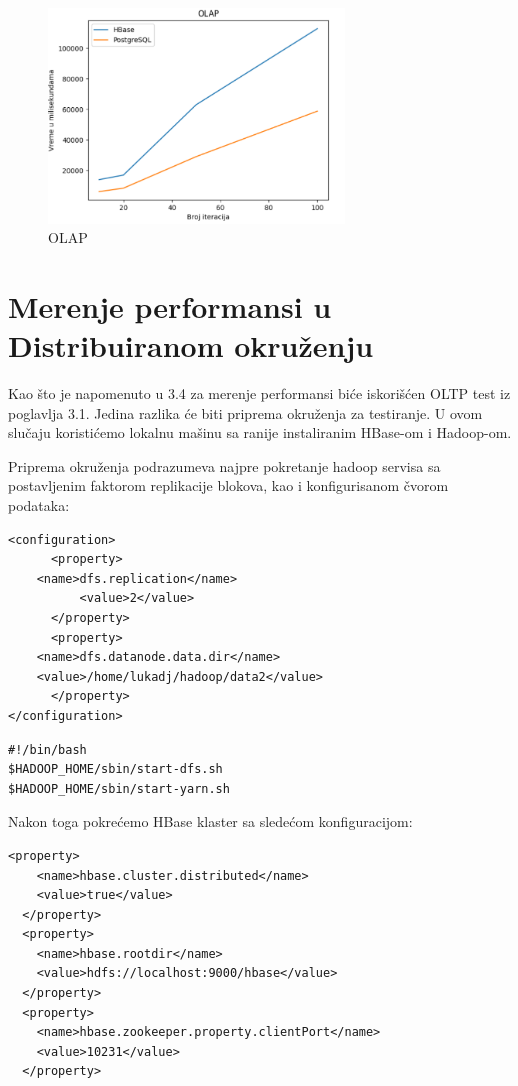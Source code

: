 \documentclass[12pt,oneside]{memoir}
\begin{document}
\begin{figure}[!ht]
  \centering
  \includegraphics[width=0.7\textwidth]{olap-vizualization2.png}
  \caption{OLAP}
  \label{fig:grafikon}
\end{figure}



\section{Merenje performansi u Distribuiranom okruženju}

Kao što je napomenuto u 3.4 za merenje performansi biće iskorišćen OLTP test iz poglavlja 3.1. Jedina razlika će biti priprema okruženja za testiranje. U ovom slučaju koristićemo lokalnu mašinu sa ranije instaliranim HBase-om i Hadoop-om. 

Priprema okruženja podrazumeva najpre pokretanje hadoop servisa sa postavljenim faktorom replikacije blokova, kao i konfigurisanom čvorom podataka:

\begin{lstlisting}[title={hdfs-site.xml},captionpos=t]
<configuration>
      <property>
	<name>dfs.replication</name>
          <value>2</value>
      </property>
      <property>
  	<name>dfs.datanode.data.dir</name>
  	<value>/home/lukadj/hadoop/data2</value>
      </property>
</configuration>
\end{lstlisting}

\begin{lstlisting}[title={start-hadoop.sh},captionpos=t]
#!/bin/bash
$HADOOP_HOME/sbin/start-dfs.sh
$HADOOP_HOME/sbin/start-yarn.sh
\end{lstlisting}

Nakon toga pokrećemo HBase klaster sa sledećom konfiguracijom: 

\begin{lstlisting}[title={hbase-site.xml},captionpos=t]
 <property>
    <name>hbase.cluster.distributed</name>
    <value>true</value>
  </property>
  <property>
    <name>hbase.rootdir</name>
    <value>hdfs://localhost:9000/hbase</value>
  </property>
  <property>
    <name>hbase.zookeeper.property.clientPort</name>
    <value>10231</value>
  </property>
\end{lstlisting}
\end{document}
